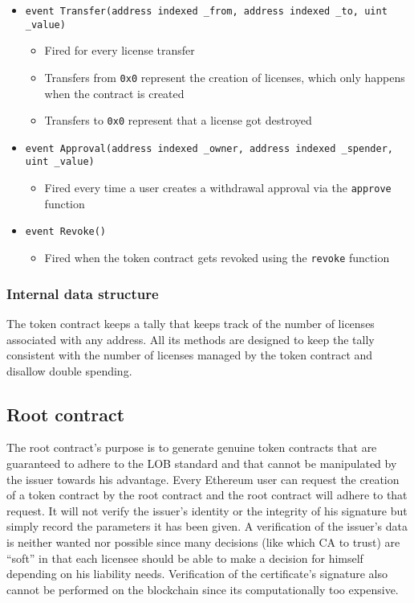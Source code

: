 \documentclass[a4paper]{article}
\begin{document}
\begin{itemize}
  \item \texttt{event Transfer(address indexed \_from, address indexed \_to, uint \_value)}
  \begin{itemize}
    \item Fired for every license transfer
    \item Transfers from \texttt{0x0} represent the creation of licenses, which only happens when the contract is created
    \item Transfers to \texttt{0x0} represent that a license got destroyed
  \end{itemize}
  
  \item \texttt{event Approval(address indexed \_owner, address indexed \_spender, uint \_value)}
  \begin{itemize}
    \item Fired every time a user creates a withdrawal approval via the \texttt{approve} function
  \end{itemize}
  
  \item \texttt{event Revoke()}
  \begin{itemize}
    \item Fired when the token contract gets revoked using the \texttt{revoke} function
  \end{itemize}
\end{itemize}

\subsubsection{Internal data structure}

The token contract keeps a tally that keeps track of the number of licenses associated with any address. All its methods are designed to keep the tally consistent with the number of licenses managed by the token contract and disallow double spending.

\subsection{Root contract}
\label{ch:rootContract}

The root contract's purpose is to generate genuine token contracts that are guaranteed to adhere to the LOB standard and that cannot be manipulated by the issuer towards his advantage. Every Ethereum user can request the creation of a token contract by the root contract and the root contract will adhere to that request. It will not verify the issuer's identity or the integrity of his signature but simply record the parameters it has been given. A verification of the issuer's data is neither wanted nor possible since many decisions (like which CA to trust) are “soft” in that each licensee should be able to make a decision for himself depending on his liability needs. Verification of the certificate's signature also cannot be performed on the blockchain since its computationally too expensive.
\end{document}
